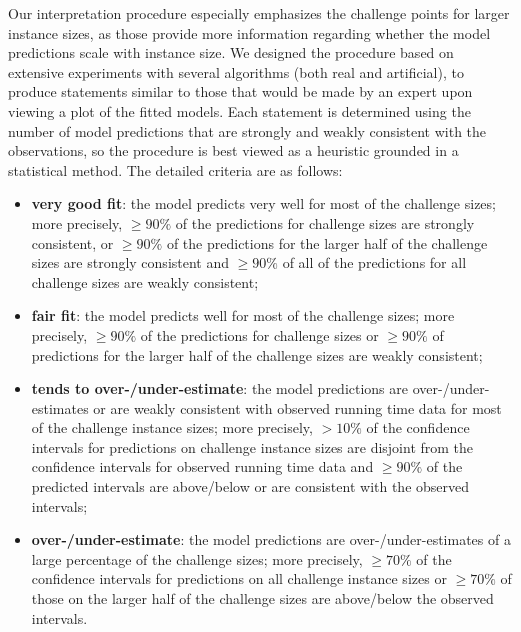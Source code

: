 \documentclass[aic]{iosart2x}
\begin{document}
Our interpretation procedure especially emphasizes the challenge points for larger instance sizes, as those provide more information regarding whether the model predictions scale with instance size. We designed the procedure based on extensive experiments with several algorithms (both real and artificial), to produce statements similar to those that would be made by an expert upon viewing a plot of the fitted models. Each statement is determined using the number of model predictions that are strongly and weakly consistent with the observations, so the procedure is best viewed as a heuristic grounded in a statistical method. The detailed criteria are as follows:
\begin{itemize}
\item \textbf{very good fit}: the model predicts very well for most of the challenge sizes; more precisely, $\geq 90\%$ of the predictions for challenge sizes are strongly consistent, or $\geq 90\%$ of the predictions for the larger half of the challenge sizes are strongly consistent and $ \geq 90\%$ of all of the predictions for all challenge sizes are weakly consistent;

\item \textbf{fair fit}: the model predicts well for most of the challenge sizes; more precisely, $\geq 90\%$ of the predictions for challenge sizes or $\geq 90\%$ of predictions for the larger half of the challenge sizes are weakly consistent;

\item \textbf{tends to over-/under-estimate}: the model predictions are over-/under-estimates or are weakly consistent with observed running time data for most of the challenge instance sizes; more precisely, $> 10\%$ of the confidence intervals for predictions on challenge instance sizes are disjoint from the confidence intervals for observed running time data and $\geq 90\%$ of the predicted intervals are above/below or are consistent with the observed intervals;

\item \textbf{over-/under-estimate}: the model predictions are over-/under-estimates of a large percentage of the challenge sizes; more precisely, $\geq 70\%$ of the confidence intervals for predictions on all challenge instance sizes or $\geq 70\%$ of those on the larger half of the challenge sizes are above/below the observed intervals.


\end{itemize}
\end{document}
